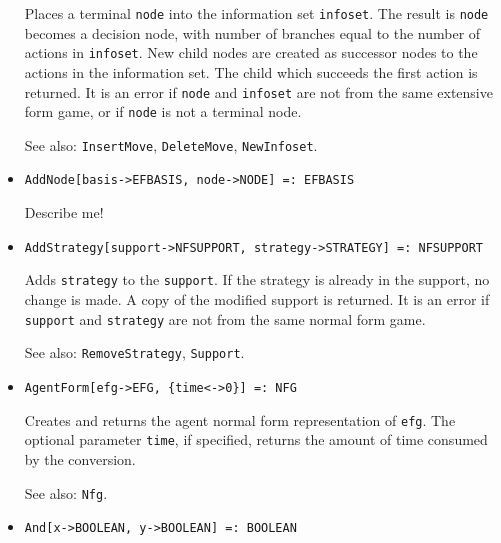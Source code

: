 \begin{itemize}
\bd
Places a terminal \verb+node+ into the information set
\verb+infoset+.  The result is \verb+node+ becomes a decision node,
with number of branches equal to the number of actions in \verb+infoset+.
New child nodes are created as successor nodes to the actions in the
information set.  The child which succeeds the first action is returned.
It is an error if \verb+node+ and \verb+infoset+ are not from the same
extensive form game, or if \verb+node+ is not a terminal node.

\item [See also:] \verb+InsertMove+, \verb+DeleteMove+,
\verb+NewInfoset+.  
\ed

\item{}
\protect \large \begin{verbatim}
AddNode[basis->EFBASIS, node->NODE] =: EFBASIS
\end{verbatim}\normalsize

\bd
Describe me!
\ed

\item{}
\protect \large \begin{verbatim}
AddStrategy[support->NFSUPPORT, strategy->STRATEGY] =: NFSUPPORT 
\end{verbatim}\normalsize

\bd
Adds \verb+strategy+ to the \verb+support+.  If the strategy is already
in the support, no change is made.  A copy of the modified support is
returned.  It is an error if \verb+support+ and \verb+strategy+ are not
from the same normal form game.

\item [See also:] \verb+RemoveStrategy+, \verb+Support+.
\ed

\item{}
\protect \large \begin{verbatim}
AgentForm[efg->EFG, {time<->0}] =: NFG 
\end{verbatim}\normalsize

\bd
Creates and returns the agent normal form representation of \verb+efg+.
The optional parameter \verb+time+, if specified, returns the amount
of time consumed by the conversion.

\item [See also:] \verb+Nfg+.
\ed

\item{} 
\protect \large \begin{verbatim}
And[x->BOOLEAN, y->BOOLEAN] =: BOOLEAN 
\end{verbatim} \normalsize


\end{itemize}
